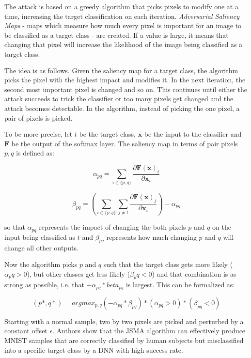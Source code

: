 The attack is based on a greedy algorithm that picks pixels to modify one at a time, increasing the target classification on each iteration.  \textit{Adversarial Saliency Maps} - maps which measure how much every pixel is important for an image to be classified as a target class - are created. If a value is large, it means that changing that pixel will increase the likelihood of the image being classified as a target class. 

The idea is as follows. Given the saliency map for a target class, the algorithm picks the pixel with the highest impact and modifies it. In the next iteration, the second most important pixel is changed and so on. This continues until either the attack succeeds to trick the classifier or too many pixels get changed and the attack becomes detectable. In the algorithm, instead of picking the one pixel, a pair of pixels is picked.

To be more precise, let $t$ be the target class, $\pmb x$ be the input to the classifier and $\pmb F$ be the output of the softmax layer. The saliency map in terms of pair pixels $p, q$ is defined as:

\[
\alpha_{pq} = \sum_{i \in \{p,q\}} \frac{\partial \pmb F(\pmb x)_t}{\partial \pmb x_i} 
\]

\[
\beta_{pq} = ( \sum_{i \in \{p,q\}} \sum_{j \neq t} \frac{\partial \pmb F (\pmb x)_j }{\partial \pmb x _i}) - \alpha_{pq}
\]

so that $\alpha_{pq}$ represents the impact of changing the both pixels $p$ and $q$ on the input being classified as $t$ and $\beta_{pq}$ represents how
much changing $p$ and $q$ will change all other outputs.

Now the algorithm picks $p$ and $q$ such that the target class gets more likely ( $\alpha_pq > 0$), but other classes get less likely ($\beta_pq < 0$) and that combination is as strong as possible, i.e. that $ - \alpha_{pq} * beta_{pq}$ is largest. This can be formalized as:

\[
(p*, q*) = arg max_{p, q} (- \alpha_{pq} * \beta_{pq}) * (\alpha_{pq} > 0) * (\beta_{pq} < 0)
\]

Starting with a normal sample, two by two pixels are picked and perturbed by a constant offset $\epsilon$. Authors show that the JSMA algorithm can effectively  produce MNIST samples that are correctly classified by human subjects but misclassified into a specific target class by a DNN with high success rate. 